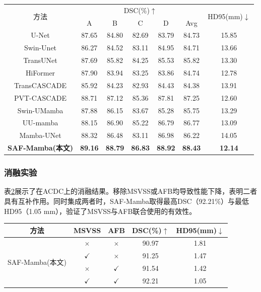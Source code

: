 \documentclass[12pt, a4paper, twoside]{article}
\begin{document}
\begin{table}[htbp]
    \centering
    \label{tab:mms_full_v2}
    \begin{tabular}{ccccccc}
        \toprule
        \multirow{2}{*}{方法} & \multicolumn{5}{c}{DSC(\%)$\uparrow$} & \multirow{2}{*}{HD95(mm)$\downarrow$} \\
        & A & B & C & D & Avg & \\
        \midrule
        U-Net & 87.65 & 84.80 & 82.69 & 83.79 & 84.73 & 15.85 \\
        Swin-Unet & 86.27 & 84.52 & 83.11 & 84.95 & 84.71 & 13.66 \\
        TransUNet & 87.69 & 85.82 & 84.25 & 85.53 & 85.82 & 13.30 \\
        HiFormer & 87.90 & 83.94 & 83.25 & 83.86 & 84.74 & 12.78 \\
        TransCASCADE & 85.92 & 84.23 & 82.93 & 84.43 & 84.38 & 13.91 \\
        PVT-CASCADE & 88.71 & 87.12 & 85.36 & 87.81 & 87.25 & 12.60 \\
        Swin-UMamba & 87.88 & 86.15 & 83.67 & 85.28 & 85.75 & 13.29 \\
        UU-mamba & 88.15 & 86.90 & 85.22 & 86.79 & 86.77 & 13.09 \\
        Mamba-UNet & 88.32 & 86.48 & 83.11 & 86.98 & 86.22 & 14.05 \\
        \midrule
        \textbf{SAF-Mamba(本文)} & \textbf{89.16} & \textbf{88.79} & \textbf{86.83} & \textbf{88.92} & \textbf{88.43} & \textbf{12.14} \\
        \bottomrule
    \end{tabular}
\end{table}

\subsubsection{消融实验}

表\ref{tab:ablation_v2}展示了在ACDC上的消融结果。移除MSVSS或AFB均导致性能下降，表明二者具有互补作用。同时集成两者时，SAF-Mamba取得最高DSC（92.21\%）与最低HD95（1.05 mm），验证了MSVSS与AFB联合使用的有效性。

\begin{table}[htbp]
    \centering
    \label{tab:ablation_v2}
    \begin{tabular}{ccccc}
        \toprule
        方法 & MSVSS & AFB & DSC(\%)$\uparrow$ & HD95(mm)$\downarrow$ \\
        \midrule
        \multirow{4}{*}{SAF-Mamba(本文)} & $\times$ & $\times$ & 90.97 & 1.81 \\
        & $\checkmark$ & $\times$ & 91.25 & 1.47 \\
        & $\times$ & $\checkmark$ & 91.54 & 1.42 \\
        & $\checkmark$ & $\checkmark$ & 92.21 & 1.05 \\
        \bottomrule
    \end{tabular}
\end{table}
\end{document}

